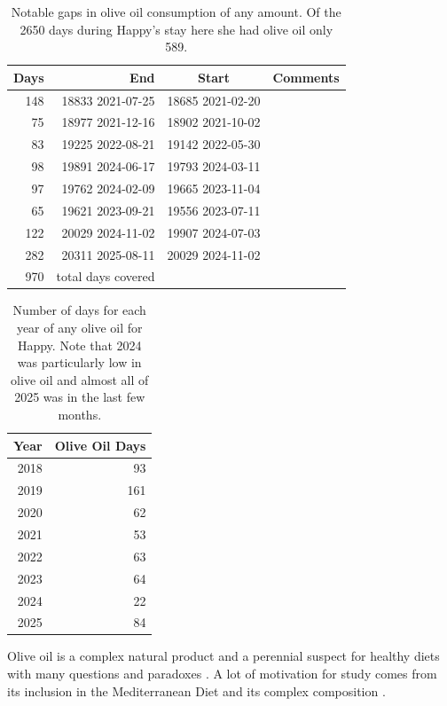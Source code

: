 \begin{table}[H] %
\parbox{.3\linewidth}{
\centering
\begin{tabular}{|r|r|c|r|}
\hline
Days & End  & Start  & Comments  \\
\hline
148 & 18833 2021-07-25 &  18685 2021-02-20 &  \\
75 & 18977 2021-12-16  & 18902 2021-10-02  &  \\
83 & 19225 2022-08-21 & 19142 2022-05-30 &  \\
98 & 19891  2024-06-17 &  19793 2024-03-11 &  \\
97 & 19762 2024-02-09 & 19665 2023-11-04 &  \\
65 & 19621 2023-09-21   & 19556 2023-07-11  &  \\
122 & 20029 2024-11-02 & 19907 2024-07-03 &  \\
282 & 20311 2025-08-11  & 20029 2024-11-02 &  \\
\hline
970 & total days covered && \\
\hline
\end{tabular}
\caption{Notable gaps in olive oil consumption of any amount. 
Of the 2650 days during Happy's stay here she had olive oil only 589.}
\label{tab:prior}
}
\end{table}
\begin{table}[H] 
\parbox{.3\linewidth}{
\centering
\begin{tabular}{|r|r|}
\hline
Year & Olive Oil Days     \\
\hline
2018 & 93 \\
2019 & 161 \\
2020 & 62 \\
2021 & 53 \\
2022 & 63 \\
2023 & 64 \\
2024 & 22 \\
2025 & 84 \\
\hline
\end{tabular}
\caption{Number of days for each year of any olive oil for Happy.
 Note that 2024 was particularly low in olive oil and almost 
all of 2025 was in the last few months.  
}
\label{tab:ooyear}
}
\end{table}




Olive oil is a complex natural product and a perennial suspect 
for healthy diets with many questions and paradoxes
\cite{https://doi.org/10.1155/2020/6719301}
\cite{10.1016/S0008-6363(01)00545-4}. 
A lot of motivation for study comes from its inclusion in the
Mediterranean Diet and its complex composition 
\cite{Silva_RodriguezPerez_BurgosRamos_Zebrafish_Model_Insights_into_2023}.

